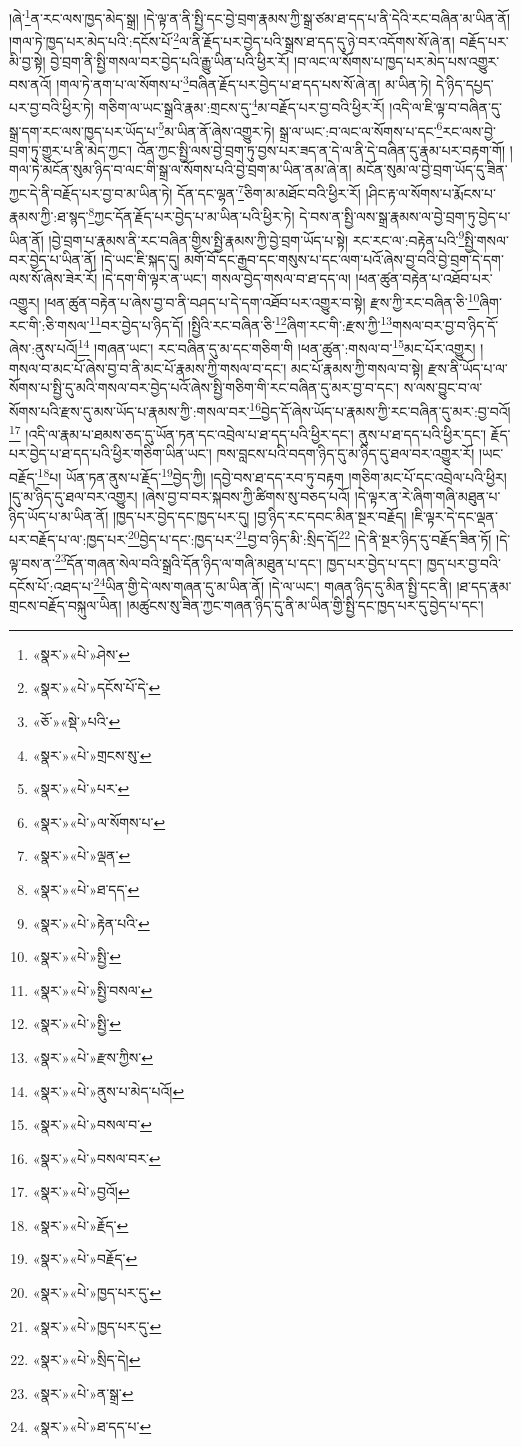 །ཞེ་\footnote{«སྣར་»«པེ་»ཤེས་}ན་རང་ལས་ཁྱད་མེད་སྒྲ། །དེ་ལྟ་ན་ནི་སྤྱི་དང་བྱེ་བྲག་རྣམས་ཀྱི་སྒྲ་ཙམ་ཐ་དད་པ་ནི་དེའི་རང་བཞིན་མ་ཡིན་ནོ། །གལ་ཏེ་ཁྱད་པར་མེད་པའི་:དངོས་པོ་\footnote{«སྣར་»«པེ་»དངོས་པོ་དེ་}ལ་ནི་རྗོད་པར་བྱེད་པའི་སྒྲས་ཐ་དད་དུ་ཉེ་བར་འདོགས་སོ་ཞེ་ན། བརྗོད་པར་མི་བྱ་སྟེ། བྱེ་བྲག་ནི་སྤྱི་གསལ་བར་བྱེད་པའི་རྒྱུ་ཡིན་པའི་ཕྱིར་རོ། །བ་ལང་ལ་སོགས་པ་ཁྱད་པར་མེད་པས་འགྱུར་བས་ནའོ། །གལ་ཏེ་ནག་པ་ལ་སོགས་པ་\footnote{«ཅོ་»«སྡེ་»པའི་}བཞིན་རྗོད་པར་བྱེད་པ་ཐ་དད་པས་སོ་ཞེ་ན། མ་ཡིན་ཏེ། དེ་ཉིད་དཔྱད་པར་བྱ་བའི་ཕྱིར་ཏེ། གཅིག་ལ་ཡང་སྒྲའི་རྣམ་:གྲངས་དུ་\footnote{«སྣར་»«པེ་»གྲངས་སུ་}མ་བརྗོད་པར་བྱ་བའི་ཕྱིར་རོ། །འདི་ལ་ཇི་ལྟ་བ་བཞིན་དུ་སྒྲ་དག་རང་ལས་ཁྱད་པར་ཡོད་པ་\footnote{«སྣར་»«པེ་»པར་}མ་ཡིན་ནོ་ཞེས་འགྱུར་ཏེ། སྒྲ་ལ་ཡང་:བ་ལང་ལ་སོགས་པ་དང་\footnote{«སྣར་»«པེ་»ལ་སོགས་པ་}རང་ལས་བྱེ་བྲག་ཏུ་གྱུར་པ་ནི་མེད་ཀྱང་། འོན་ཀྱང་སྤྱི་ལས་བྱེ་བྲག་ཏུ་བྱས་པར་ཟད་ན་དེ་ལ་ནི་དེ་བཞིན་དུ་རྣམ་པར་བརྟག་གོ། །གལ་ཏེ་མངོན་སུམ་ཉིད་བ་ལང་གི་སྒྲ་ལ་སོགས་པའི་བྱེ་བྲག་མ་ཡིན་ནམ་ཞེ་ན། མངོན་སུམ་ལ་བྱེ་བྲག་ཡོད་དུ་ཟིན་ཀྱང་དེ་ནི་བརྗོད་པར་བྱ་བ་མ་ཡིན་ཏེ། དོན་དང་ལྷན་\footnote{«སྣར་»«པེ་»ལྡན་}ཅིག་མ་མཐོང་བའི་ཕྱིར་རོ། །ཤིང་རྟ་ལ་སོགས་པ་རྨོངས་པ་རྣམས་ཀྱི་:ཐ་སྙད་\footnote{«སྣར་»«པེ་»ཐ་དད་}ཀྱང་དོན་རྗོད་པར་བྱེད་པ་མ་ཡིན་པའི་ཕྱིར་ཏེ། དེ་བས་ན་སྤྱི་ལས་སྒྲ་རྣམས་ལ་བྱེ་བྲག་ཏུ་བྱེད་པ་ཡིན་ནོ། །བྱེ་བྲག་པ་རྣམས་ནི་རང་བཞིན་གྱིས་སྤྱི་རྣམས་ཀྱི་བྱེ་བྲག་ཡོད་པ་སྟེ། རང་རང་ལ་:བརྟེན་པའི་\footnote{«སྣར་»«པེ་»རྟེན་པའི་}སྤྱི་གསལ་བར་བྱེད་པ་ཡིན་ནོ། །དེ་ཡང་ཇི་སྐད་དུ། མགོ་བོ་དང་རྒྱབ་དང་གསུས་པ་དང་ལག་པའོ་ཞེས་བྱ་བའི་བྱེ་བྲག་དེ་དག་ལས་སོ་ཞེས་ཟེར་རོ། །དེ་དག་གི་ལྟར་ན་ཡང་། གསལ་བྱེད་གསལ་བ་ཐ་དད་ལ། །ཕན་ཚུན་བརྟེན་པ་འཐོབ་པར་འགྱུར། །ཕན་ཚུན་བརྟེན་པ་ཞེས་བྱ་བ་ནི་བཤད་པ་དེ་དག་འཐོབ་པར་འགྱུར་བ་སྟེ། རྫས་ཀྱི་རང་བཞིན་ཅི་\footnote{«སྣར་»«པེ་»སྤྱི་}ཞིག་རང་གི་:ཅི་གསལ་\footnote{«སྣར་»«པེ་»སྤྱི་བསལ་}བར་བྱེད་པ་ཉིད་དོ། །སྤྱིའི་རང་བཞིན་ཅི་\footnote{«སྣར་»«པེ་»སྤྱི་}ཞིག་རང་གི་:རྫས་ཀྱི་\footnote{«སྣར་»«པེ་»རྫས་ཀྱིས་}གསལ་བར་བྱ་བ་ཉིད་དོ་ཞེས་:ནུས་པའོ།\footnote{«སྣར་»«པེ་»ནུས་པ་མེད་པའོ།} །གཞན་ཡང་། རང་བཞིན་དུ་མ་དང་གཅིག་གི །ཕན་ཚུན་:གསལ་བ་\footnote{«སྣར་»«པེ་»བསལ་བ་}མང་པོར་འགྱུར། །གསལ་བ་མང་པོ་ཞེས་བྱ་བ་ནི་མང་པོ་རྣམས་ཀྱི་གསལ་བ་དང་། མང་པོ་རྣམས་ཀྱི་གསལ་བ་སྟེ། རྫས་ནི་ཡོད་པ་ལ་སོགས་པ་སྤྱི་དུ་མའི་གསལ་བར་བྱེད་པའོ་ཞེས་སྤྱི་གཅིག་གི་རང་བཞིན་དུ་མར་བྱ་བ་དང་། ས་ལས་བྱུང་བ་ལ་སོགས་པའི་རྫས་དུ་མས་ཡོད་པ་རྣམས་ཀྱི་:གསལ་བར་\footnote{«སྣར་»«པེ་»བསལ་བར་}བྱེད་དོ་ཞེས་ཡོད་པ་རྣམས་ཀྱི་རང་བཞིན་དུ་མར་:བྱ་བའོ།\footnote{«སྣར་»«པེ་»བྱའོ།} །འདི་ལ་རྣམ་པ་ཐམས་ཅད་དུ་ཡོན་ཏན་དང་འབྲེལ་པ་ཐ་དད་པའི་ཕྱིར་དང་། ནུས་པ་ཐ་དད་པའི་ཕྱིར་དང་། རྗོད་པར་བྱེད་པ་ཐ་དད་པའི་ཕྱིར་གཅིག་ཡིན་ཡང་། ཁས་བླངས་པའི་བདག་ཉིད་དུ་མ་ཉིད་དུ་ཐལ་བར་འགྱུར་རོ། །ཡང་བརྗོད་\footnote{«སྣར་»«པེ་»རྗོད་}པ། ཡོན་ཏན་ནུས་པ་རྗོད་\footnote{«སྣར་»«པེ་»བརྗོད་}བྱེད་ཀྱི། །དབྱེ་བས་ཐ་དད་རབ་ཏུ་བརྟག །གཅིག་མང་པོ་དང་འབྲེལ་པའི་ཕྱིར། །དུ་མ་ཉིད་དུ་ཐལ་བར་འགྱུར། །ཞེས་བྱ་བ་བར་སྐབས་ཀྱི་ཚིགས་སུ་བཅད་པའོ། །དེ་ལྟར་ན་རེ་ཞིག་གཞི་མཐུན་པ་ཉིད་ཡོད་པ་མ་ཡིན་ནོ། །ཁྱད་པར་བྱེད་དང་ཁྱད་པར་དུ། །བྱ་ཉིད་རང་དབང་མིན་སྔར་བརྗོད། །ཇི་ལྟར་དེ་དང་ལྡན་པར་བརྗོད་པ་ལ་:ཁྱད་པར་\footnote{«སྣར་»«པེ་»ཁྱད་པར་དུ་}བྱེད་པ་དང་:ཁྱད་པར་\footnote{«སྣར་»«པེ་»ཁྱད་པར་དུ་}བྱ་བ་ཉིད་མི་:སྲིད་དོ།\footnote{«སྣར་»«པེ་»སྲིད་དེ།} །དེ་ནི་སྔར་ཉིད་དུ་བརྗོད་ཟིན་ཏོ། །དེ་ལྟ་བས་ན་\footnote{«སྣར་»«པེ་»ན་སྒྲ་}དོན་གཞན་སེལ་བའི་སྒྲའི་དོན་ཉིད་ལ་གཞི་མཐུན་པ་དང་། ཁྱད་པར་བྱེད་པ་དང་། ཁྱད་པར་བྱ་བའི་དངོས་པོ་:འཐད་པ་\footnote{«སྣར་»«པེ་»ཐ་དད་པ་}ཡིན་གྱི་དེ་ལས་གཞན་དུ་མ་ཡིན་ནོ། །དེ་ལ་ཡང་། གཞན་ཉིད་དུ་མིན་སྤྱི་དང་ནི། །ཐ་དད་རྣམ་གྲངས་བརྗོད་བསྐུལ་ཡིན། །མཚུངས་སུ་ཟིན་ཀྱང་གཞན་ཉིད་དུ་ནི་མ་ཡིན་གྱི་སྤྱི་དང་ཁྱད་པར་དུ་བྱེད་པ་དང་། 